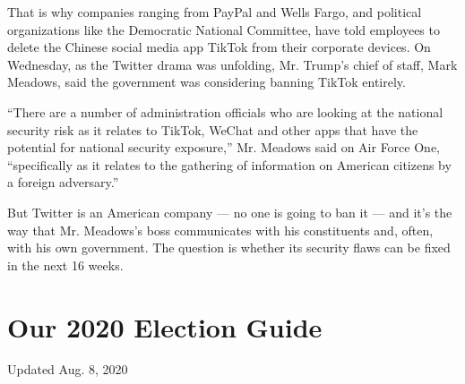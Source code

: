 That is why companies ranging from PayPal and Wells Fargo, and political
organizations like the Democratic National Committee, have told
employees to delete the Chinese social media app TikTok from their
corporate devices. On Wednesday, as the Twitter drama was unfolding, Mr.
Trump's chief of staff, Mark Meadows, said the government was
considering banning TikTok entirely.

``There are a number of administration officials who are looking at the
national security risk as it relates to TikTok, WeChat and other apps
that have the potential for national security exposure,'' Mr. Meadows
said on Air Force One, ``specifically as it relates to the gathering of
information on American citizens by a foreign adversary.''

But Twitter is an American company --- no one is going to ban it --- and
it's the way that Mr. Meadows's boss communicates with his constituents
and, often, with his own government. The question is whether its
security flaws can be fixed in the next 16 weeks.

\hypertarget{our-2020-election-guide}{%
\section{Our 2020 Election Guide}\label{our-2020-election-guide}}

Updated Aug. 8, 2020

